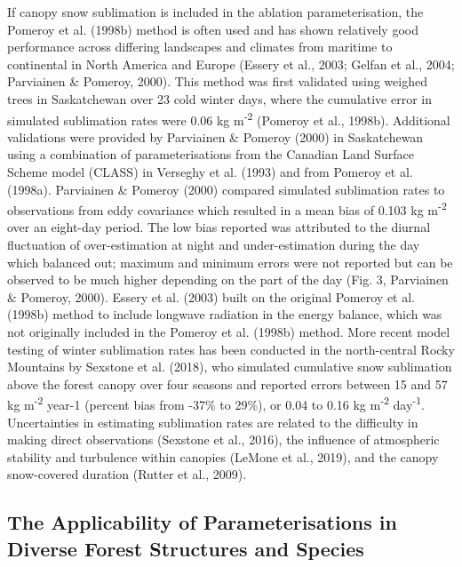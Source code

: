 \documentclass[
  letterpaper,
]{tex/uofsthesis-cs}
\begin{document}
If canopy snow sublimation is included in the ablation parameterisation,
the Pomeroy et al. (1998b) method is often used and has shown relatively
good performance across differing landscapes and climates from maritime
to continental in North America and Europe (Essery et al., 2003; Gelfan
et al., 2004; Parviainen \& Pomeroy, 2000). This method was first
validated using weighed trees in Saskatchewan over 23 cold winter days,
where the cumulative error in simulated sublimation rates were 0.06 kg
m\textsuperscript{-2} (Pomeroy et al., 1998b). Additional validations
were provided by Parviainen \& Pomeroy (2000) in Saskatchewan using a
combination of parameterisations from the Canadian Land Surface Scheme
model (CLASS) in Verseghy et al. (1993) and from Pomeroy et al. (1998a).
Parviainen \& Pomeroy (2000) compared simulated sublimation rates to
observations from eddy covariance which resulted in a mean bias of 0.103
kg m\textsuperscript{-2} over an eight-day period. The low bias reported
was attributed to the diurnal fluctuation of over-estimation at night
and under-estimation during the day which balanced out; maximum and
minimum errors were not reported but can be observed to be much higher
depending on the part of the day (Fig. 3, Parviainen \& Pomeroy, 2000).
Essery et al. (2003) built on the original Pomeroy et al. (1998b) method
to include longwave radiation in the energy balance, which was not
originally included in the Pomeroy et al. (1998b) method. More recent
model testing of winter sublimation rates has been conducted in the
north-central Rocky Mountains by Sexstone et al. (2018), who simulated
cumulative snow sublimation above the forest canopy over four seasons
and reported errors between 15 and 57 kg m\textsuperscript{-2} year-1
(percent bias from -37\% to 29\%), or 0.04 to 0.16 kg
m\textsuperscript{-2} day\textsuperscript{-1}. Uncertainties in
estimating sublimation rates are related to the difficulty in making
direct observations (Sexstone et al., 2016), the influence of
atmospheric stability and turbulence within canopies (LeMone et al.,
2019), and the canopy snow-covered duration (Rutter et al., 2009).

\subsection{The Applicability of Parameterisations in Diverse Forest
Structures and
Species}\label{the-applicability-of-parameterisations-in-diverse-forest-structures-and-species}
\end{document}
